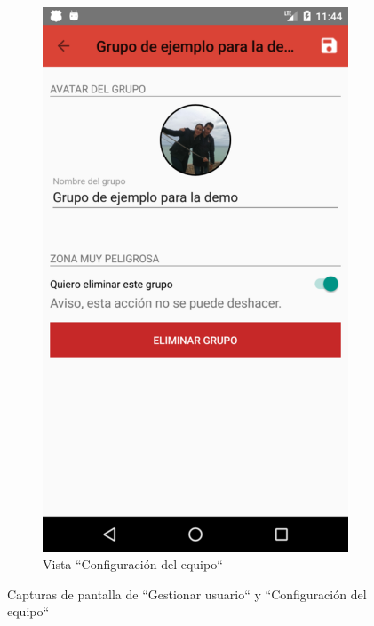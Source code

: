 \documentclass[twoside]{report}
\begin{document}
\begin{figure}[H]
\begin{center}
\begin{subfigure}[t]{.3\linewidth}
		\includegraphics[scale=0.25]{images/userguide/18.png}
		\caption{Vista “Configuración del equipo“}
	\end{subfigure}\hspace{2mm}%
\caption{Capturas de pantalla de “Gestionar usuario“ y “Configuración del equipo“}
\end{center}
\end{figure}
\end{document}

